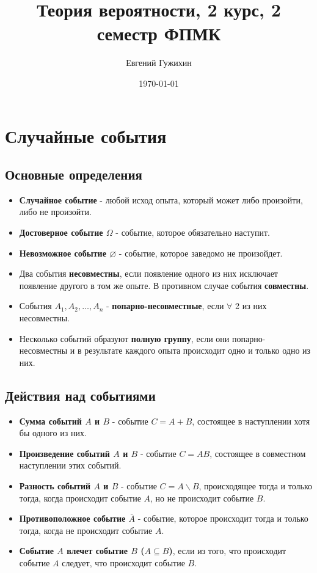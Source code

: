 \documentclass[a5paper,10pt]{article}
\author{Евгений Гужихин}
\title{Теория вероятности, 2 курс, 2 семестр ФПМК}
\date{\today}
\begin{document}
	\maketitle

	\tableofcontents{}
	\newpage

	\section{Случайные события}
		\subsection{Основные определения}
			\begin{itemize}[label={}]
				\item \textbf{Случайное событие} - любой исход опыта, который может либо произойти, либо не произойти.
				\item \textbf{Достоверное событие $\Omega$} - событие, которое обязательно наступит.
				\item \textbf{Невозможное событие $\varnothing$} - событие, которое заведомо не произойдет.
				\item Два события \textbf{несовместны}, если появление одного из них исключает появление другого в том же опыте. В противном случае события \textbf{совместны}.
				\item События $A_1,A_2,\ldots,A_n$ - \textbf{попарно-несовместные}, если $\forall$ 2 из них несовместны.
				\item Несколько событий образуют \textbf{полную группу}, если они попарно-несовместны и в результате каждого опыта происходит одно и только одно из них.
			\end{itemize}

		\subsection{Действия над событиями}
			\begin{itemize}[label={}]
				\item \textbf{Сумма событий $A$ и $B$} - событие $C = A + B$, состоящее в наступлении хотя бы одного из них.
				\item \textbf{Произведение событий $A$ и $B$} - событие $C = AB$, состоящее в совместном наступлении этих событий.
				\item \textbf{Разность событий $A$ и $B$} - событие $C = A \backslash B$, происходящее тогда и только тогда, когда происходит событие $A$, но не происходит событие $B$.
				\item \textbf{Противоположное событие $\overline{A}$} - событие, которое происходит тогда и только тогда, когда не происходит событие $A$.
				\item \textbf{Событие $A$ влечет событие $B$ ($A \subseteq B$)}, если из того, что происходит событие $A$ следует, что происходит событие $B$.
			\end{itemize}
\end{document}
